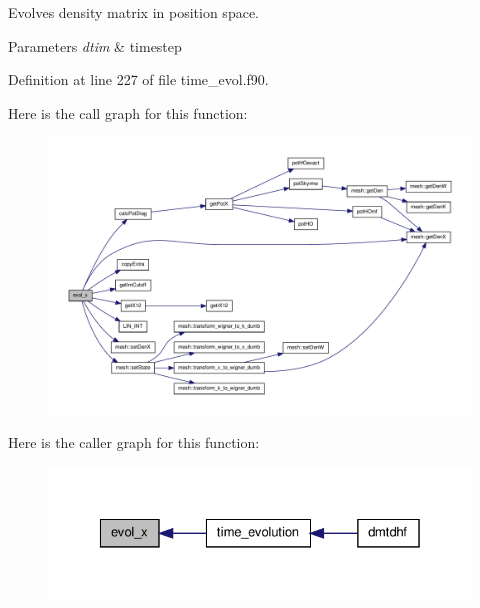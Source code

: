 Evolves density matrix in position space. 


\begin{DoxyParams}{Parameters}
{\em dtim} & timestep \\
\hline
\end{DoxyParams}


Definition at line 227 of file time\_\-evol.f90.



Here is the call graph for this function:\nopagebreak
\begin{figure}[H]
\begin{center}
\leavevmode
\includegraphics[width=400pt]{time__evol_8f90_a3b0f1dd129befe0c02108523072801e3_cgraph}
\end{center}
\end{figure}




Here is the caller graph for this function:\nopagebreak
\begin{figure}[H]
\begin{center}
\leavevmode
\includegraphics[width=326pt]{time__evol_8f90_a3b0f1dd129befe0c02108523072801e3_icgraph}
\end{center}
\end{figure}


